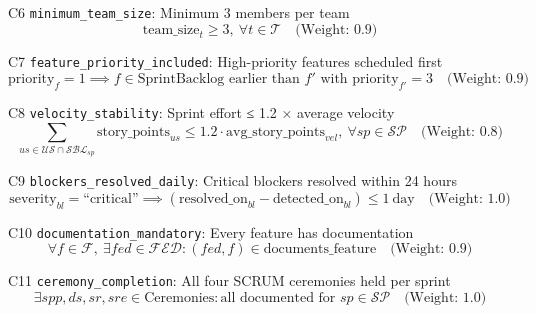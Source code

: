 \documentclass[12pt]{article}
\begin{document}
    \item[C6] \texttt{minimum\_team\_size}: Minimum 3 members per team
    \[
    \text{team\_size}_t \geq 3,\ \forall t \in \mathcal{T} \quad \text{(Weight: 0.9)}
    \]

    \item[C7] \texttt{feature\_priority\_included}: High-priority features scheduled first
    \[
    \text{priority}_f = 1 \implies f \in \text{SprintBacklog earlier than } f' \text{ with } \text{priority}_{f'} = 3 \quad \text{(Weight: 0.9)}
    \]

    \item[C8] \texttt{velocity\_stability}: Sprint effort ≤ 1.2 × average velocity
    \[
    \sum_{us \in \mathcal{US} \cap \mathcal{SBL}_{sp}} \text{story\_points}_{us} \leq 1.2 \cdot \text{avg\_story\_points}_{vel},\ \forall sp \in \mathcal{SP} \quad \text{(Weight: 0.8)}
    \]

    \item[C9] \texttt{blockers\_resolved\_daily}: Critical blockers resolved within 24 hours
    \[
    \text{severity}_{bl} = \text{``critical''} \implies (\text{resolved\_on}_{bl} - \text{detected\_on}_{bl}) \leq 1\ \text{day} \quad \text{(Weight: 1.0)}
    \]

    \item[C10] \texttt{documentation\_mandatory}: Every feature has documentation
    \[
    \forall f \in \mathcal{F},\ \exists fed \in \mathcal{FED}: (fed, f) \in \text{documents\_feature} \quad \text{(Weight: 0.9)}
    \]

    \item[C11] \texttt{ceremony\_completion}: All four SCRUM ceremonies held per sprint
    \[
    \exists spp, ds, sr, sre \in \text{Ceremonies}: \text{all documented for } sp \in \mathcal{SP} \quad \text{(Weight: 1.0)}
    \]
\end{document}
